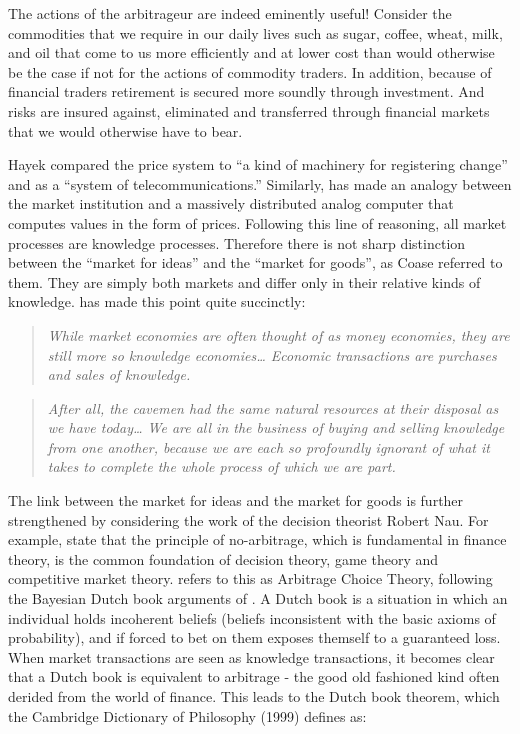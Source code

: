 \documentclass[11pt,]{article}
\begin{document}
The actions of the arbitrageur are indeed eminently useful! Consider the
commodities that we require in our daily lives such as sugar, coffee,
wheat, milk, and oil that come to us more efficiently and at lower cost
than would otherwise be the case if not for the actions of commodity
traders. In addition, because of financial traders retirement is secured
more soundly through investment. And risks are insured against,
eliminated and transferred through financial markets that we would
otherwise have to bear.

Hayek compared the price system to ``a kind of machinery for registering
change'' and as a ``system of telecommunications.'' Similarly,
\citet{Scarf1990} has made an analogy between the market institution and
a massively distributed analog computer that computes values in the form
of prices. Following this line of reasoning, all market processes are
knowledge processes. Therefore there is not sharp distinction between
the ``market for ideas'' and the ``market for goods'', as Coase referred
to them. They are simply both markets and differ only in their relative
kinds of knowledge. \citet{Sowell1996} has made this point quite
succinctly:

\begin{quote}
\emph{While market economies are often thought of as money economies,
they are still more so knowledge economies\ldots{} Economic transactions
are purchases and sales of knowledge.}
\end{quote}

\begin{quote}
\emph{After all, the cavemen had the same natural resources at their
disposal as we have today\ldots{} We are all in the business of buying
and selling knowledge from one another, because we are each so
profoundly ignorant of what it takes to complete the whole process of
which we are part.}
\end{quote}

The link between the market for ideas and the market for goods is
further strengthened by considering the work of the decision theorist
Robert Nau. For example, \citet{NauMcCardle1991} state that the
principle of no-arbitrage, which is fundamental in finance theory, is
the common foundation of decision theory, game theory and competitive
market theory. \citet{Nau1999} refers to this as Arbitrage Choice
Theory, following the Bayesian Dutch book arguments of
\citet{deFinetti1937}. A Dutch book is a situation in which an
individual holds incoherent beliefs (beliefs inconsistent with the basic
axioms of probability), and if forced to bet on them exposes themself to
a guaranteed loss. When market transactions are seen as knowledge
transactions, it becomes clear that a Dutch book is equivalent to
arbitrage - the good old fashioned kind often derided from the world of
finance. This leads to the Dutch book theorem, which the Cambridge
Dictionary of Philosophy (1999) defines as:
\end{document}
